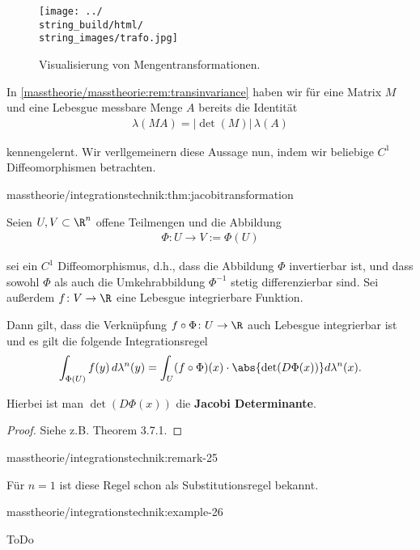 \documentclass[letterpaper,10pt,german]{jupyterBook}
\begin{document}
\begin{figure}[htbp]
\centering


\noindent\texttt{[image: ../\\string\_build/html/\\string\_images/trafo.jpg]}
\caption{Visualisierung von Mengentransformationen.}\label{\detokenize{masstheorie/integrationstechnik:fig-trafo}}\end{figure}

\par
In \cref{masstheorie/masstheorie:rem:transinvariance} haben wir für eine Matrix \(M\) und eine Lebesgue messbare Menge \(A\) bereits die Identität
\begin{align*}
\lambda(MA) = |\det(M)| \, \lambda(A)
\end{align*}
\par
kennengelernt. Wir verllgemeinern diese Aussage nun, indem wir beliebige \(C^1\) Diffeomorphismen betrachten.
\begin{theorem}{}{masstheorie/integrationstechnik:thm:jacobitransformation}



\par
Seien \(U, V \subset \R^n\) offene Teilmengen und die Abbildung
\begin{align*}
\Phi \colon U \rightarrow V := \Phi(U)
\end{align*}
\par
sei ein \(C^1\) Diffeomorphismus, d.h., dass die Abbildung \(\Phi\) invertierbar ist, und dass sowohl \(\Phi\) als auch die Umkehrabbildung \(\Phi^{-1}\) stetig differenzierbar sind.
Sei außerdem \(f \colon V \rightarrow \R\) eine Lebesgue integrierbare Funktion.

\par
Dann gilt, dass die Verknüpfung \(f \circ \Phi \colon U \rightarrow \R\) auch Lebesgue integrierbar ist und es gilt die folgende Integrationsregel
\begin{align*}
\int_{\Phi(U)} f(y)\,d\lambda^n(y) = \int_U (f \circ \Phi)(x) \cdot \abs{\det(D\Phi(x))} d\lambda^n(x).\end{align*}
\par
Hierbei ist man \(\det(D\Phi(x))\) die \textbf{Jacobi Determinante}.
\end{theorem}

\begin{proof}
 Siehe z.B. \cite{Bog07} Theorem 3.7.1.
\end{proof}
\begin{remark}{}{masstheorie/integrationstechnik:remark-25}



\par
Für \(n=1\) ist diese Regel schon als Substitutionsregel bekannt.
\end{remark}
\begin{example}{}{masstheorie/integrationstechnik:example-26}



\par
ToDo
\end{example}
\end{document}
